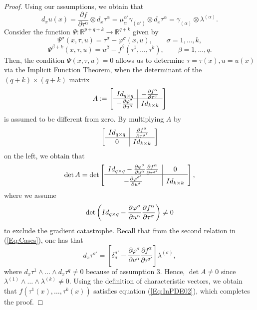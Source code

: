 \documentclass{birkjour}
\theoremstyle{definition}
\theoremstyle{remark}
\numberwithin{equation}{section}
\numberwithin{equation}{section}
\numberwithin{thm}{section}
\numberwithin{equation}{section}
\numberwithin{thm}{section}
\begin{document}
\begin{proof}
	Using our assumptions, we obtain that
	$$
	d_xu(x)=\frac{\partial f}{\partial \tau^\alpha}\otimes d_x\tau^\alpha=\mu_\alpha^{\alpha'}\gamma_{(\alpha')}\otimes d_x\tau^\alpha=\gamma_{(\alpha)}\otimes \lambda^{(\alpha)}.
	$$	
	Consider the function $\Psi:\mathbb{R}^{p+q+k}\rightarrow \mathbb{R}^{q+k}$ given by
	$$
	\Psi^\sigma(x,\tau,u)=\tau^\sigma-\varphi^\sigma(x,u),\qquad \sigma=1,\ldots,k,
	$$
	$$
	\Psi^{\beta+k}(x,\tau,u)=u^\beta-f^\beta(\tau^1,\ldots,\tau^k),\qquad \beta=1,\ldots,q.
	$$
	Then, the condition $\Psi(x,\tau,u)=0$ allows us to determine $\tau=\tau(x),u=u(x)$ via the Implicit Function Theorem, when  the determinant of the $(q+k)\times (q+k)$ matrix
	$$
	A:=\left[\begin{array}{c|c}
		{\rm Id}_{q\times q}&-\frac{\partial f^{\alpha}}{\partial \tau^\sigma}\\
		\hline
		-\frac{\partial \varphi^{\sigma}}{\partial u^\alpha}&{\rm Id}_{k\times k}
	\end{array}\right]
	$$
	is assumed to be different from zero. By multiplying $A$ by 
	$$
	\left[\begin{array}{c|c}
		{\rm Id}_{q\times q}&\frac{\partial f^\alpha}{\partial \tau^{\sigma'}}\\
		\hline
		0&{\rm Id}_{k\times k}
	\end{array}\right]
	$$
	on the left, we obtain that 
	$$
	\det A=\det \left[\begin{array}{c|c}
		{\rm Id}_{q\times q}-\frac{\partial \varphi^\sigma}{\partial u^\alpha}\frac{\partial f^\alpha}{\partial \tau^{\sigma'}}&0\\
		\hline
		-\frac{\partial \varphi^{\sigma'}}{\partial u^\sigma}&{\rm Id}_{k\times k}
	\end{array}\right],$$
	where we assume 
	$$
	\det\left({\rm Id}_{q\times q}-\frac{\partial \varphi^\sigma}{\partial u^\alpha}\frac{\partial f^\alpha}{\partial \tau^\sigma}\right)\neq 0
	$$
	to exclude the gradient catastrophe. Recall that from the second relation in (\ref{Eq:Cases}), one has that
	$$
	d_x\tau^{\sigma'}=\left[\delta^{\sigma'}_\sigma-\frac{\partial \varphi^\sigma}{\partial u^\alpha}\frac{\partial f^\alpha}{\partial \tau^{\sigma'}}\right]\lambda^{(\sigma)},
	$$
	where $d_x\tau^1\wedge\ldots\wedge d_x\tau^q\neq 0$ because of assumption 3. 
	Hence, $\det A\neq 0$ since  $\lambda^{(1)}\wedge \ldots\wedge \lambda^{(k)}\neq 0$.  Using the definition of characteristic vectors, we obtain that $f(\tau^1(x),\ldots,\tau^k(x))$ satisfies equation (\ref{Eq:InPDE02}), which completes the proof.
\end{proof}
\end{document}
